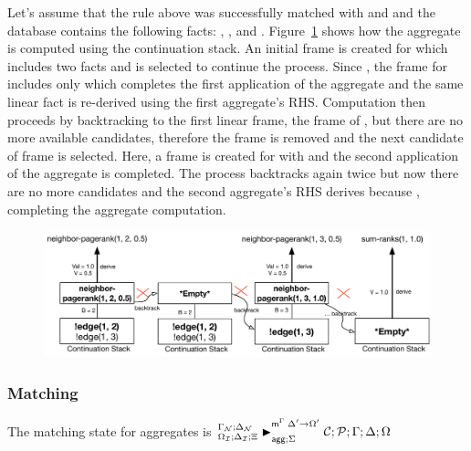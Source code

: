 Let's assume that the rule above was successfully matched with  and
 and the database contains the following facts: , ,  and
. Figure~\ref{fig:logic:backtrack} shows how
the aggregate is computed using the continuation stack. An initial frame is
created for  which includes two  facts and
 is selected to continue the process. Since ,
the frame for  includes only
 which completes the first application of the
aggregate and the same linear fact is re-derived using the first aggregate's
RHS.  Computation then proceeds by backtracking to the first linear frame, the
frame of , but there are no more available
candidates, therefore the frame is removed and the next candidate  of frame  is selected. Here, a frame is
created for  with  and the second
application of the aggregate is completed. The process backtracks again twice
but now there are no more candidates and the second aggregate's RHS derives
 because , completing the aggregate
computation.

\begin{figure}[ht]
   \begin{center}
      \includegraphics[width=0.85\linewidth]{figures/logical_foundations/backtrack.pdf}
   \end{center}
   \label{fig:logic:backtrack}
\end{figure}

\subsubsection{Matching}

The matching state for aggregates is 
$\matstatea{\deltan}{\lstack{C};
   \lstack{P}}{\Gamma}{\Delta}{\Omega}{\Delta' \rightarrow \Omega'}{\Sigma}$

